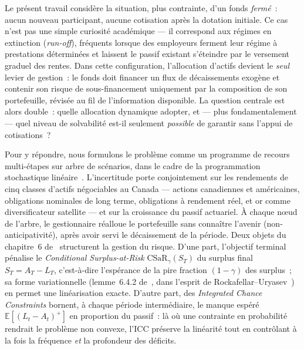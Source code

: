 \documentclass[11pt,letterpaper]{article}
\newcommand{\E}{\mathbb{E}}
\newcommand{\CSaR}{\mathrm{CSaR}}
\newcommand{\pos}[1]{\left(#1\right)^{+}}
\theoremstyle{definition}
\begin{document}
Le présent travail considère la situation, plus contrainte, d'un fonds
\emph{fermé}~: aucun nouveau participant, aucune cotisation après la dotation
initiale. Ce cas n'est pas une simple curiosité académique --- il correspond aux
régimes en extinction (\emph{run-off}), fréquents lorsque des employeurs ferment
leur régime à prestations déterminées et laissent le passif existant s'éteindre par
le versement graduel des rentes. Dans cette configuration, l'allocation d'actifs
devient le \emph{seul} levier de gestion~: le fonds doit financer un flux de
décaissements exogène et contenir son risque de sous-financement uniquement par la
composition de son portefeuille, révisée au fil de l'information disponible. La
question centrale est alors double~: quelle allocation dynamique adopter, et ---
plus fondamentalement --- quel niveau de solvabilité est-il seulement
\emph{possible} de garantir sans l'appui de cotisations~?

Pour y répondre, nous formulons le problème comme un programme de recours
multi-étapes sur arbre de scénarios, dans le cadre de la programmation stochastique
linéaire~\cite{KHvdVR2020}. L'incertitude porte conjointement sur les rendements de
cinq classes d'actifs négociables au Canada --- actions canadiennes et américaines,
obligations nominales de long terme, obligations à rendement réel, et or comme
diversificateur satellite --- et sur la croissance du passif actuariel. À chaque
n\oe ud de l'arbre, le gestionnaire réalloue le portefeuille sans connaître l'avenir
(non-anticipativité), après avoir servi le décaissement de la période. Deux objets du
chapitre~6 de~\cite{KHvdVR2020} structurent la gestion du risque. D'une part,
l'objectif terminal pénalise le \emph{Conditional Surplus-at-Risk}
$\CSaR_\gamma(S_T)$ du surplus final $S_T = A_T - L_T$, c'est-à-dire l'espérance de
la pire fraction $(1-\gamma)$ des surplus~; sa forme variationnelle
(lemme~6.4.2 de~\cite{KHvdVR2020}, dans l'esprit de
Rockafellar--Uryasev~\cite{RU2000}) en permet une linéarisation exacte. D'autre
part, des \emph{Integrated Chance Constraints} bornent, à chaque période
intermédiaire, le manque espéré $\E[\pos{L_t - A_t}]$ en proportion du passif~: là où
une contrainte en probabilité rendrait le problème non convexe, l'ICC préserve la
linéarité tout en contrôlant à la fois la fréquence \emph{et} la profondeur des
déficits.
\end{document}
